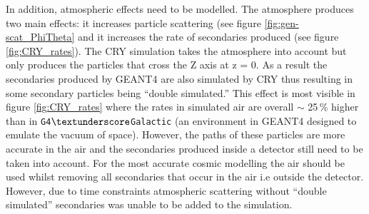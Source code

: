 In addition, atmospheric effects need to be modelled. The atmosphere produces two main effects: it increases particle scattering (see figure \ref{fig:gen-scat_PhiTheta} and it increases the rate of secondaries produced (see figure \ref{fig:CRY_rates}). The CRY simulation takes the atmosphere into account \cite{hagmann2007monteCry} but only produces the particles that cross the Z axis at z = 0. As a result the secondaries produced by GEANT4 are also simulated by CRY thus resulting in some secondary particles being ``double simulated.'' This effect is most visible in figure \ref{fig:CRY_rates} where the rates in simulated air are overall $\sim$ 25\,\% higher than in \texttt{G4$\textunderscore$Galactic} (an environment in GEANT4 designed to emulate the vacuum of space). However, the paths of these particles are more accurate in the air and the secondaries produced inside a detector still need to be taken into account. For the most accurate cosmic modelling the air should be used whilst removing all secondaries that occur in the air i.e outside the detector. However, due to time constraints atmospheric scattering without ``double simulated'' secondaries was unable to be added to the simulation. 

